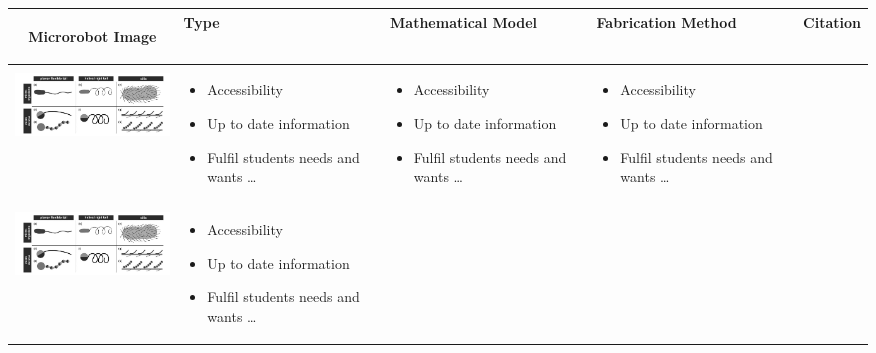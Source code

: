 \documentclass{article}
\newcommand{\rowstyle}[1]{\gdef\currentrowstyle{#1}%
#1\ignorespaces
}
\begin{document}
\begin{table}[htb]
 \centering
\setlength{\arrayrulewidth}{.6mm}
\setlength{\tabcolsep}{5pt}
\renewcommand{\arraystretch}{.8}


  \begin{tabular}{  c | m{3cm} | m{3cm} | m{3cm} | m{1cm} }
    \hline
\rowcolor{lightgray}
\rowstyle{\bfseries}



    Microrobot Image & Type & Mathematical Model & Fabrication Method & Citation\\ \hline\hline
    \begin{minipage}{.3\textwidth}
      \includegraphics[width=\linewidth, height=20mm]{cilia}
    \end{minipage}
    &
     \begin{itemize}
        \item Accessibility
        \item Up to date information
        \item Fulfil students needs and wants \ldots
      \end{itemize}
    
    & 

      \begin{itemize}
        \item Accessibility
        \item Up to date information
        \item Fulfil students needs and wants \ldots
      \end{itemize}
    &

	 \begin{itemize}
        \item Accessibility
        \item Up to date information
        \item Fulfil students needs and wants \ldots
      \end{itemize} \\
    \begin{minipage}{.3\textwidth}
      \includegraphics[width=\linewidth, height=20mm]{cilia}
    \end{minipage}
    &
     \begin{itemize}
        \item Accessibility
        \item Up to date information
        \item Fulfil students needs and wants \ldots
      \end{itemize}
    

\end{tabular}
\end{table}
\end{document}
